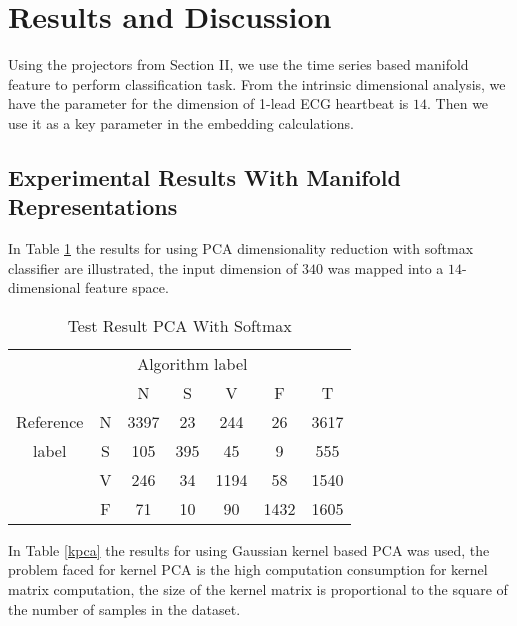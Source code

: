 \documentclass[journal]{IEEEtran}
\begin{document}
%
%


\section{Results and Discussion}
Using the projectors from Section II, we use the time series based manifold feature to perform classification task. 
From the intrinsic dimensional analysis, we have the parameter for the dimension of 1-lead ECG heartbeat is $14$.
Then we use it as a key parameter in the embedding calculations. 

\subsection{Experimental Results With Manifold Representations}


In Table \ref{pca} the results for using PCA dimensionality reduction with softmax classifier are illustrated, the input dimension of $340$ was mapped into a $14$-dimensional feature space.
\begin{table}[!htbp]
\begin{center}
\begin{threeparttable}
\caption{Test Result PCA With Softmax}
\label{pca}
\begin{tabular}{ccccccc}
\hline
\multicolumn{5}{r}{Algorithm label} \\
\cline{3-6}
		&  & N & S      & V    & F       & T\\
\hline
 Reference & N & 3397 &  23  &  244   & 26    &  3617 \\
	label  & S &  105    & 395  &   45   & 9    &  555\\
		   & V &  246    & 34    & 1194 & 58    &  1540\\
		   & F &  71   & 10    & 90    & 1432   &  1605\\		
\hline
\end{tabular}
\end{threeparttable}
\end{center}
\end{table}


In Table \ref{kpca} the results for using Gaussian kernel based PCA was used, the problem faced for kernel PCA is the high computation consumption for kernel matrix  computation, the size of the kernel matrix is proportional to the square of the number of samples in the dataset.
\end{document}
